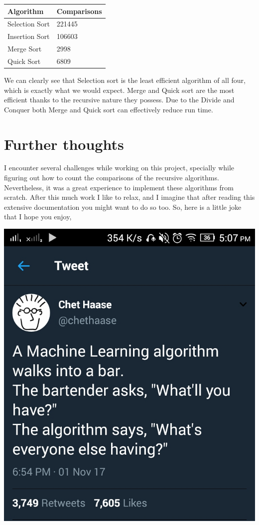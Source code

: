 \documentclass[letterpaper, 10pt]{article}
\begin{document}
\begin{table}[h!]
\centering
\begin{tabular}{|l|l|}
\hline
\textbf{Algorithm}      & \textbf{Comparisons} \\ \hline
Selection Sort & 221445      \\ \hline
Insertion Sort & 106603      \\ \hline
Merge Sort     & 2998        \\ \hline
Quick Sort     & 6809        \\ \hline
\end{tabular}
\end{table}
We can clearly see that Selection sort is the least efficient algorithm of all four, which is exactly what we would expect. Merge and Quick sort are the most efficient thanks to the recursive nature they possess. Due to the Divide and Conquer both Merge and Quick sort can effectively reduce run time.

\section{Further thoughts}
I encounter several challenges while working on this project, specially while figuring out how to count the comparisons of the recursive algorithms. Nevertheless, it was a great experience to implement these algorithms from scratch. After this much work I like to relax, and I imagine that after reading this extensive documentation you might want to do so too. So, here is a little joke that I hope you enjoy,

\begin{center}
\includegraphics[scale=0.25]{images/wosfjh4e79601.jpg}
\end{center}
\end{document}
